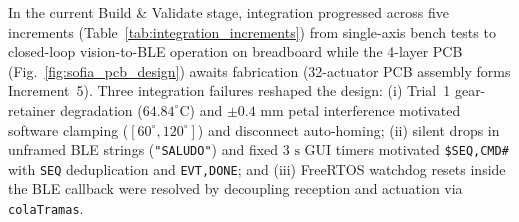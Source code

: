 \documentclass[lettersize,journal]{IEEEtran}
\begin{document}
	In the current Build \& Validate stage, integration progressed across five increments (Table~\ref{tab:integration_increments}) from single-axis bench tests to closed-loop vision-to-BLE operation on breadboard while the 4-layer PCB (Fig.~\ref{fig:sofia_pcb_design}) awaits fabrication (32-actuator PCB assembly forms Increment~5). Three integration failures reshaped the design: (i) Trial~1 gear-retainer degradation ($64.84^\circ\text{C}$) and $\pm 0.4\text{ mm}$ petal interference motivated software clamping ($[60^\circ, 120^\circ]$) and disconnect auto-homing; (ii) silent drops in unframed BLE strings (\texttt{"SALUDO"}) and fixed $3\text{ s}$ GUI timers motivated \texttt{\$SEQ,CMD\#} with \texttt{SEQ} deduplication and \texttt{EVT,DONE}; and (iii) FreeRTOS watchdog resets inside the BLE callback were resolved by decoupling reception and actuation via \texttt{colaTramas}.
	
	\begin{table}[!t]
		\centering
		\caption{Incremental Subsystem Integration and Verification Log}
		\label{tab:integration_increments}
		\scriptsize
		\setlength{\tabcolsep}{2pt}
		\renewcommand{\arraystretch}{0.84}
	\end{table}
	
\end{document}
